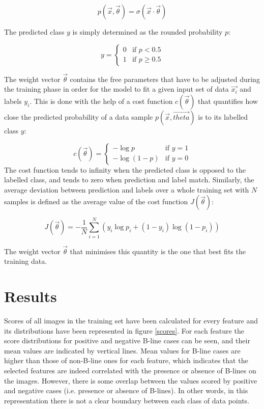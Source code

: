 \documentclass[12pt]{article} %
\begin{document}
\begin{equation}
p(\vec{x}, \vec{\theta}) = \sigma(\vec{x}\cdot\vec{\theta})
\end{equation}\break

	The predicted class $y$ is simply determined as the rounded probability $p$:


\begin{equation}
y =
\left\{
	\begin{array}{ll}
		0  & \mbox{if } p < 0.5 \\
		1 & \mbox{if } p \geq 0.5
	\end{array}
\right.
\end{equation}

	The weight vector $\vec{\theta}$ contains the free parameters that have to be adjusted during the training phase in order for the model to fit a given input set of data ${\vec{x_i}}$ and labels ${y_i}$. This is done with the help of a cost function $c(\vec{\theta})$ that quantifies how close the predicted probability of a data sample $p(\vec{x}, \vec{theta})$ is to its labelled class $y$:

\begin{equation}
c(\vec{\theta}) =
\left\{
	\begin{array}{ll}
		-\log{p}  & \mbox{if } y = 1 \\
		-\log{(1-p)} & \mbox{if } y = 0
	\end{array}
\right.
\end{equation}
	The cost function tends to infinity when the predicted class is opposed to the labelled class, and tends to zero when prediction and label match. Similarly, the average deviation between prediction and labels over a whole training set with $N$ samples is defined as the average value of the cost function $J(\vec{\theta})$:

\begin{equation}
J(\vec{\theta}) = -\frac{1}{N}\sum_{i=1}^{N} \left( y_i \log{p_i} + (1-y_i)\log{(1-p_i)} \right)
\end{equation}

The weight vector $\vec{\theta}$ that minimises this quantity is the one that best fits the training data.


\section{Results}

	Scores of all images in the training set have been calculated for every feature and its distributions have been represented in figure \ref{scores}. For each feature the score distributions for positive and negative B-line cases can be seen, and their mean values are indicated by vertical lines. Mean values for B-line cases are higher than those of non-B-line ones for each feature, which indicates that the selected features are indeed correlated with the presence or absence of B-lines on the images. However, there is some overlap between the values scored by positive and negative cases (i.e. presence or absence of B-lines). In other words, in this representation there is not a clear boundary between each class of data points. 
	
\end{document}
